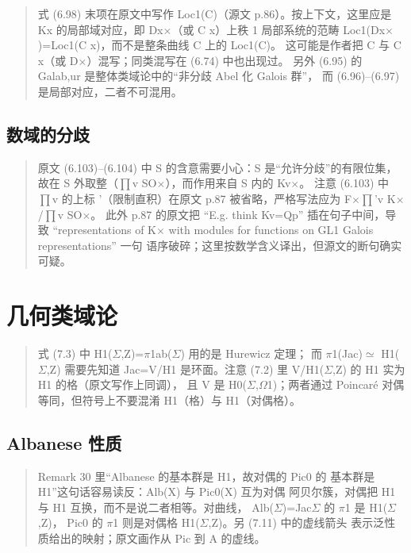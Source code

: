 \begin{quote}\small
式 (6.98) 末项在原文中写作 Loc1(C)（源文 p.86）。按上下文，这里应是 Kx 的局部域对应，即 Dx$\times$（或 C x）上秩 1 局部系统的范畴 Loc1(Dx$\times$)=Loc1(C x)，而不是整条曲线 C 上的 Loc1(C)。 这可能是作者把 C 与 C x（或 D$\times$）混写；同类混写在 (6.74) 中也出现过。 另外 (6.95) 的 Galab,ur 是整体类域论中的“非分歧 Abel 化 Galois 群”， 而 (6.96)--(6.97) 是局部对应，二者不可混用。
\end{quote}

\subsection*{数域的分歧}
\begin{quote}\small
原文 (6.103)--(6.104) 中 S 的含意需要小心：S 是“允许分歧”的有限位集， 故在 S 外取整（$\prod$v SO$\times$），而作用来自 S 内的 Kv$\times$。 注意 (6.103) 中 $\prod$v 的上标 '（限制直积）在原文 p.87 被省略，严格写法应为 F$\times$$\prod$'v K$\times$/$\prod$v SO$\times$。 此外 p.87 的原文把 “E.g. think Kv=Qp” 插在句子中间，导致 “representations of K$\times$ with modules for functions on GL1 Galois representations” 一句 语序破碎；这里按数学含义译出，但源文的断句确实可疑。
\end{quote}

\section{几何类域论}
\begin{quote}\small
式 (7.3) 中 H1($\Sigma$,Z)=$\pi$1ab($\Sigma$) 用的是 Hurewicz 定理； 而 $\pi$1(Jac)$\simeq$ H1($\Sigma$,Z) 需要先知道 Jac=V/H1 是环面。注意 (7.2) 里 V/H1($\Sigma$,Z) 的 H1 实为 H1 的格（原文写作上同调）， 且 V 是 H0($\Sigma$,$\Omega$1)；两者通过 Poincaré 对偶等同，但符号上不要混淆 H1（格）与 H1（对偶格）。
\end{quote}

\subsection*{Albanese 性质}
\begin{quote}\small
Remark 30 里“Albanese 的基本群是 H1，故对偶的 Pic0 的 基本群是 H1”这句话容易读反：Alb(X) 与 Pic0(X) 互为对偶 阿贝尔簇，对偶把 H1 与 H1 互换，而不是说二者相等。对曲线， Alb($\Sigma$)=Jac$\Sigma$ 的 $\pi$1 是 H1($\Sigma$,Z)， Pic0 的 $\pi$1 则是对偶格 H1($\Sigma$,Z)。另 (7.11) 中的虚线箭头 表示泛性质给出的映射；原文画作从 Pic 到 A 的虚线。
\end{quote}

